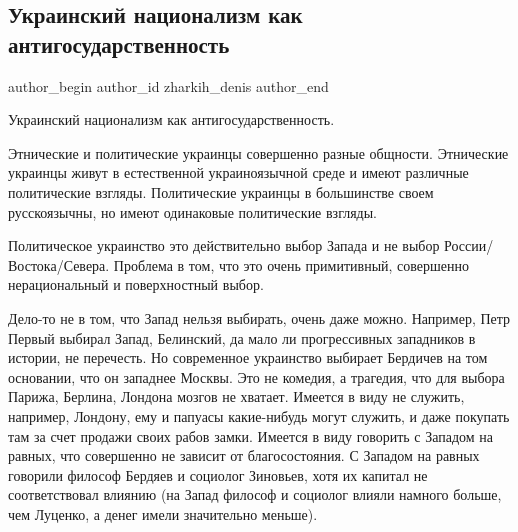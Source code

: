  
 
 
 
 
 
\subsection{Украинский национализм как антигосударственность}
\label{sec:10_11_2021.fb.zharkih_denis.1.ukr_nacionalizm_antigosudarstvennost}
 
\ifcmt
 author_begin
   author_id zharkih_denis
 author_end
\fi

Украинский национализм как антигосударственность. 

Этнические и политические украинцы совершенно разные общности. Этнические
украинцы живут в естественной украиноязычной среде и имеют различные
политические взгляды. Политические украинцы в большинстве своем русскоязычны,
но имеют одинаковые политические взгляды. 

Политическое украинство это действительно выбор Запада и не выбор
России/Востока/Севера. Проблема в том, что это очень примитивный, совершенно
нерациональный и поверхностный выбор. 

Дело-то не в том, что Запад нельзя выбирать, очень даже можно. Например, Петр
Первый выбирал Запад, Белинский, да мало ли прогрессивных западников в истории,
не перечесть. Но современное украинство выбирает Бердичев на том основании, что
он западнее Москвы. Это не комедия, а трагедия, что для выбора Парижа, Берлина,
Лондона мозгов не хватает. Имеется в виду не служить, например, Лондону, ему и
папуасы какие-нибудь могут служить, и даже покупать там за счет продажи своих
рабов замки. Имеется в виду говорить с Западом на равных, что совершенно не
зависит от благосостояния. С Западом на равных говорили философ Бердяев и
социолог Зиновьев, хотя их капитал не соответствовал влиянию (на Запад философ
и социолог влияли намного больше, чем Луценко, а денег имели значительно
меньше). 

